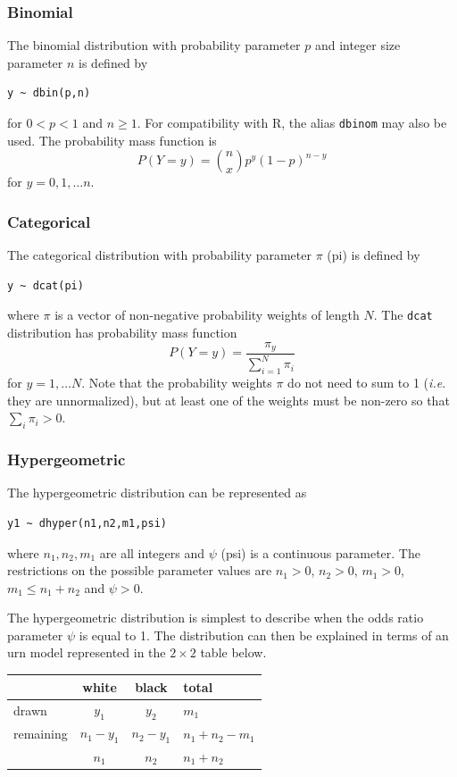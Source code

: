 \documentclass[11pt, a4paper, titlepage]{report}
\newcommand{\R}{\textsf{R}}
\begin{document}
{\subsubsection{Binomial}
\label{bugs:dbin}

The binomial distribution with probability parameter $p$ and integer
size parameter $n$ is defined by
\begin{verbatim}
y ~ dbin(p,n)
\end{verbatim}
for $0 < p < 1$ and $n \geq 1$. For compatibility with \R, the alias
\texttt{dbinom} may also be used. The probability mass function is
\[
P(Y=y) = {n \choose x}  p^y (1-p)^{n-y}
\]
for $y = 0, 1, \ldots n$.

\subsubsection{Categorical}

The categorical distribution with probability parameter $\pi$ (pi) is
defined by
\begin{verbatim}
y ~ dcat(pi)
\end{verbatim}
where $\pi$ is a vector of non-negative probability weights of
length $N$. The \texttt{dcat} distribution has probability mass
function
\[
P(Y=y) = \frac{\pi_y}{\sum_{i=1}^N \pi_i}
\]
for $y = 1, \ldots N$. Note that the probability weights $\pi$ do not
need to sum to 1 ({\em i.e.} they are unnormalized), but at least one
of the weights must be non-zero so that $\sum_i \pi_i > 0$.

\subsubsection{Hypergeometric}
\label{bugs:dhyper}

The hypergeometric distribution can be represented as
\begin{verbatim}
y1 ~ dhyper(n1,n2,m1,psi)
\end{verbatim}
where $n_1, n_2, m_1$ are all integers and $\psi$ (psi) is a continuous
parameter. The restrictions on the possible parameter values are
$n_1 > 0$, $n_2 > 0$, $m_1 > 0$, $m_1 \leq n_1 + n_2$ and $\psi > 0$.

The hypergeometric distribution is simplest to describe when the odds
ratio parameter $\psi$ is equal to 1. The distribution can then be
explained in terms of an urn model represented in the $2 \times 2$
table below.

\begin{center}
\begin{tabular}{l|cc|l}
   & white & black & total \\
  \hline
  drawn    & $y_1$ & $y_2$ & $m_1$ \\
  remaining & $n_1 - y_1$  & $n_2 - y_1$  & $n_1 + n_2 - m_1$ \\
  \hline
  & $n_1$ & $n_2$ & $n_1 + n_2$ \\
\end{tabular}
\end{center}
  
}
\end{document}
